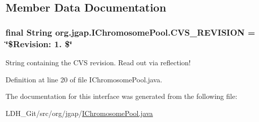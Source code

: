\subsection{Member Data Documentation}
\hypertarget{interfaceorg_1_1jgap_1_1_i_chromosome_pool_ab847d47751d5e687022ffb82b3ce7937}{
\subsubsection[{C\-V\-S\-\_\-\-R\-E\-V\-I\-S\-I\-O\-N}]{\setlength{\rightskip}{0pt plus 5cm}final String org.\-jgap.\-I\-Chromosome\-Pool.\-C\-V\-S\-\_\-\-R\-E\-V\-I\-S\-I\-O\-N = \char`\"{}\$Revision\-: 1. \$\char`\"{}\hspace{0.3cm}{\ttfamily [static]}}}\label{interfaceorg_1_1jgap_1_1_i_chromosome_pool_ab847d47751d5e687022ffb82b3ce7937}
String containing the C\-V\-S revision. Read out via reflection! 

Definition at line 20 of file I\-Chromosome\-Pool.\-java.



The documentation for this interface was generated from the following file\-:\begin{DoxyCompactItemize}
\item 
L\-D\-H\-\_\-\-Git/src/org/jgap/\hyperlink{_i_chromosome_pool_8java}{I\-Chromosome\-Pool.\-java}\end{DoxyCompactItemize}
